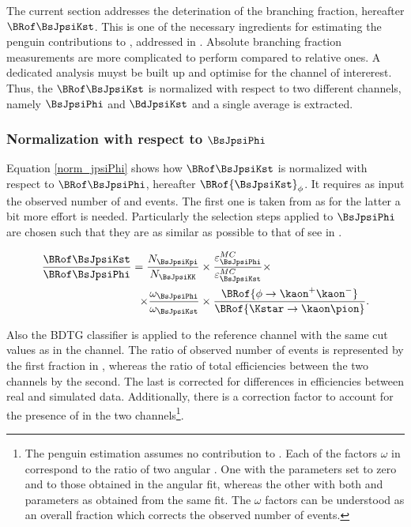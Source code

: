 
The current section addresses the deterination of the \BsJpsiKst branching fraction, hereafter $\BRof\BsJpsiKst$.
This is one of the necessary ingredients for estimating the penguin contributions to \phis, addressed in .
Absolute branching fraction measurements are more complicated to perform compared to relative ones. A dedicated analysis
muyst be built up and optimise for the channel of intererest. Thus, the $\BRof\BsJpsiKst$ is normalized with respect
to two different channels, namely $\BsJpsiPhi$ and $\BdJpsiKst$ and a single average is extracted.

\subsubsection{Normalization with respect to $\BsJpsiPhi$}
Equation \ref{norm_jpsiPhi} shows how $\BRof\BsJpsiKst$ is normalized with respect to $\BRof\BsJpsiPhi$, hereafter $\BRof{\BsJpsiKst}_\phi$.
It requires as input the observed number of \BsJpsiKst and \BsJpsiPhi events. The first one is taken from  as for
the latter a bit more effort is needed. Particularly the selection steps applied to $\BsJpsiPhi$
are chosen such that they are as similar as possible to that of \BsJpsiKst see in .

\begin{align}
  \centering
\frac{\BRof\BsJpsiKst}{\BRof\BsJpsiPhi} = \frac{N_{\BsJpsiKpi}}{N_{\BsJpsiKK}}
                                  &\times \frac{\varepsilon_{\BsJpsiPhi}^{MC}}{\varepsilon_{\BsJpsiKst}^{MC}}
                                   \times \nonumber \\
                                  \times \frac{\omega_{\BsJpsiPhi}}{\omega_{\BsJpsiKst}}
                                  & \times \frac{\BRof{\phi\to\kaon^+\kaon^-}}{\BRof{\Kstar\to\kaon\pion}}.
\label{norm_jpsiPhi}
\end{align}

\noindent Also the BDTG classifier is applied to the reference channel
with the same cut values as in the \BsJpsiKst channel. The ratio of observed number of events is represented by the first fraction in ,
whereas the ratio of total efficiencies between the two channels by the second. The last is corrected for differences in efficiencies between real and
simulated data. Additionally, there is a correction factor to account for the presence of \swave in the two
channels\footnote{The penguin estimation assumes no \swave contribution to \BsJpsiKst. Each of the factors $\omega$ in  correspond
to the ratio of two angular \pdfs. One with the \swave parameters set to zero and \pwave to those obtained in the angular fit,  whereas the other
with both \pwave and \swave parameters as obtained from the same fit. The $\omega$ factors can be understood as an overall \swave fraction which
corrects the observed number of events.
}.

